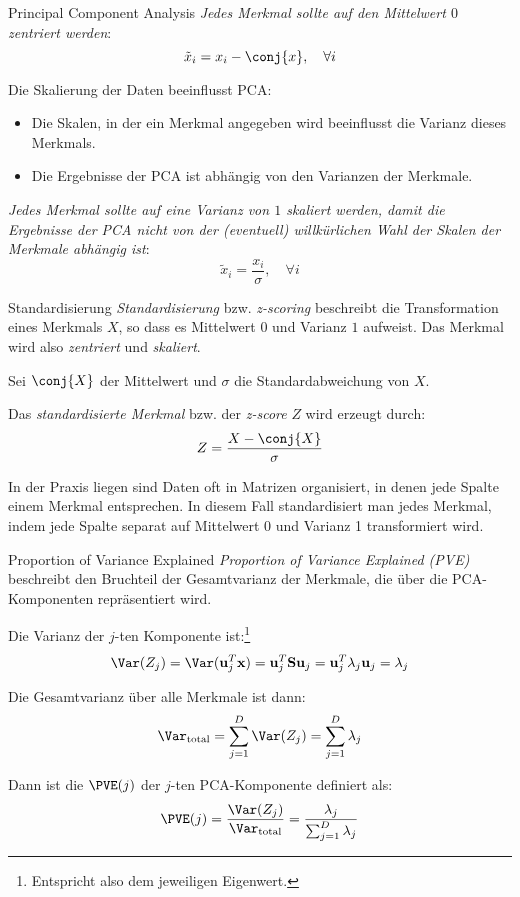 \begin{defi}{Principal Component Analysis}
    \emph{Jedes Merkmal sollte auf den Mittelwert $0$ zentriert werden}:
    \[
        \tilde{x}_i = x_i - \conj{x}, \quad \forall i
    \]

    Die Skalierung der Daten beeinflusst PCA:
    \begin{itemize}
        \item Die Skalen, in der ein Merkmal angegeben wird beeinflusst die Varianz dieses Merkmals.
        \item Die Ergebnisse der PCA ist abhängig von den Varianzen der Merkmale.
    \end{itemize}

    \emph{Jedes Merkmal sollte auf eine Varianz von $1$ skaliert werden, damit die Ergebnisse der PCA nicht von der (eventuell) willkürlichen Wahl der Skalen der Merkmale abhängig ist}:
    \[
        \tilde{x}_i = \frac{x_i}{\sigma}, \quad \forall i
    \]
\end{defi}

\begin{bonus}{Standardisierung}
    \emph{Standardisierung} bzw. \emph{z-scoring} beschreibt die Transformation eines Merkmals $X$, so dass es Mittelwert $0$ und Varianz $1$ aufweist.
    Das Merkmal wird also \emph{zentriert} und \emph{skaliert}.

    Sei $\conj{X}$ der Mittelwert und $\sigma$ die Standardabweichung von $X$.

    Das \emph{standardisierte Merkmal} bzw. der \emph{z-score} $Z$ wird erzeugt durch:
    \[
        Z = \frac{X - \conj{X}}{\sigma}
    \]

    In der Praxis liegen sind Daten oft in Matrizen organisiert, in denen jede Spalte einem Merkmal entsprechen.
    In diesem Fall standardisiert man jedes Merkmal, indem jede Spalte separat auf Mittelwert 0 und Varianz 1 transformiert wird.
\end{bonus}

\begin{defi}{Proportion of Variance Explained}
    \emph{Proportion of Variance Explained (PVE)} beschreibt den Bruchteil der Gesamtvarianz der Merkmale, die über die PCA-Komponenten repräsentiert wird.

    Die Varianz der $j$-ten Komponente ist:\footnote{Entspricht also dem jeweiligen Eigenwert.}
    \[
        \Var(Z_j) = \Var(\mathbf{u}_j^T \mathbf{x}) = \mathbf{u}_j^T \mathbf{S} \mathbf{u}_j = \mathbf{u}_j^T \lambda_j \mathbf{u}_j = \lambda_j
    \]

    Die Gesamtvarianz über alle Merkmale ist dann:
    \[
        \Var_\text{total} = \sum_{j=1}^D \Var(Z_j) = \sum_{j=1}^D \lambda_j
    \]

    Dann ist die $\PVE(j)$ der $j$-ten PCA-Komponente definiert als:
    \[
        \PVE(j) = \frac{\Var(Z_j)}{\Var_\text{total}} = \frac{\lambda_j}{\sum_{j=1}^D \lambda_j}
    \]
\end{defi}

